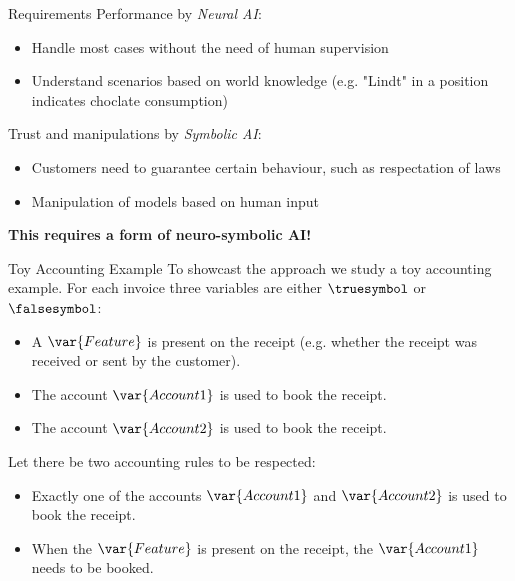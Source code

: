 \documentclass{beamer}
\begin{document}
    \begin{frame}{Requirements}
        Performance by \emph{Neural AI}:
        \begin{itemize}
            \item Handle most cases without the need of human supervision
            \item Understand scenarios based on world knowledge (e.g. "Lindt" in a position indicates choclate consumption)
        \end{itemize}

        Trust and manipulations by \emph{Symbolic AI}:
        \begin{itemize}
            \item Customers need to guarantee certain behaviour, such as respectation of laws
            \item Manipulation of models based on human input
        \end{itemize}

        \begin{center}
            \bf This requires a form of neuro-symbolic AI!
        \end{center}
    \end{frame}

    \begin{frame}{Toy Accounting Example}
        To showcast the approach we study a toy accounting example.
        For each invoice three variables are either $\truesymbol$ or $\falsesymbol$:
        \begin{itemize}
            \item A $\var{Feature}$ is present on the receipt (e.g. whether the receipt was received or sent by the customer).
            \item The account $\var{Account 1}$ is used to book the receipt.
            \item The account $\var{Account 2}$ is used to book the receipt.
        \end{itemize}

        Let there be two accounting rules to be respected:
        \begin{itemize}
            \item Exactly one of the accounts $\var{Account 1}$ and $\var{Account 2}$ is used to book the receipt.
            \item When the $\var{Feature}$ is present on the receipt, the $\var{Account 1}$ needs to be booked.
        \end{itemize}
    \end{frame}
\end{document}
